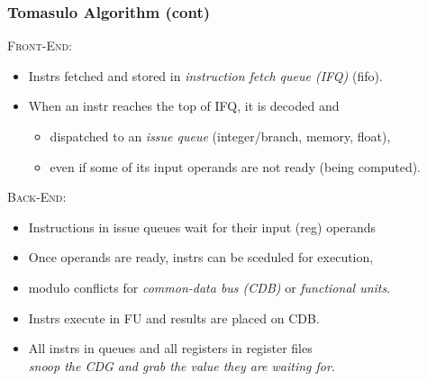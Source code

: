 \documentclass{beamer}
\newcommand{\emphh}[1]{\textcolor{CosGreen}{ #1}}
\begin{document}
\begin{frame}[fragile,t]
\frametitle{Tomasulo Algorithm (cont)}

\textsc{Front-End}:
\begin{itemize}
    \item Instrs fetched and stored in 
           \emphh{\em instruction fetch queue (IFQ)} ({\sc fifo}).
    \item When an instr reaches the top of IFQ, it is decoded and
    \begin{itemize}
        \item dispatched to an \emphh{\em issue queue} (integer/branch, memory, float),
        \item even if some of its input operands are not ready (being computed). 
    \end{itemize}
\end  {itemize}\medskip

\textsc{Back-End:}
\begin{itemize} 
    \item Instructions in issue queues wait for their input (reg) operands
    \item Once operands are ready, instrs can be sceduled for execution, 
    \item modulo conflicts for \emphh{\em common-data bus (CDB)} or \emphh{\em functional units}.
    \item Instrs execute in FU and results are placed on CDB.
    \item All instrs in queues and all registers in register files\\
            \emphh{\em snoop the CDG and grab the value they are waiting for}.
\end  {itemize}

\end{frame}
\end{document}
